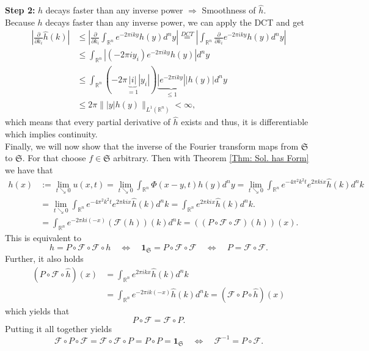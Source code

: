 \documentclass[A4,12pt,twoside]{book}
\begin{document}
{\textbf{Step 2:} $h$ decays faster than any inverse power $\Rightarrow$ Smoothness of $\hat{h}$.\\
Because $h$ decays faster than any inverse power, we can apply the DCT and get 
\begin{align*}
    |\frac{\partial}{\partial k_i} \hat{h}(k)| &\leq \left| \frac{\partial}{\partial k_i} \int_{\mathbb{R}^n} e^{-2 \pi i ky} h(y) d^n y \right| \stackrel{DCT}{=}  \left| \int_{\mathbb{R}^n} \frac{\partial}{\partial k_i}    e^{-2 \pi i ky} h(y) d^n y \right| \\
    &\leq  \int_{\mathbb{R}^n}  \left| (-2 \pi i y_i)  e^{-2 \pi i ky} h(y)\right|  d^n y \\
    &\leq  \int_{\mathbb{R}^n}  (-2 \pi \underbrace{|i|}_{=1} |y_i|)  \underbrace{\left|e^{-2 \pi i ky}\right|}_{\leq 1}  |h(y) | d^n y \\
    &\leq 2 \pi \| |y| h(y) \|_{L^1(\mathbb{R}^n)}< \infty,
\end{align*}
which means that every partial derivative of $\hat{h}$ exists and thus, it is differentiable which implies continuity.\\
Finally, we will now show that the inverse of the Fourier transform maps from $\mathfrak{S}$ to $\mathfrak{S}$. For that choose $f \in \mathfrak{S}$ arbitrary. Then with Theorem \ref{Thm: Sol. has Form} we have that
\begin{align*}
h(x) &:= \lim_{t \searrow 0} u(x,t) =\lim_{t \searrow 0} \int_{\mathbb{R}^n} \Phi (x-y,t) h(y)d^n y  =\lim_{t \searrow 0} \int_{\mathbb{R}^n} e^{-4 \pi^2 k^2 t} e^{2 \pi k i x} \hat{h}(k) d^n k\\
&= \lim_{t \searrow 0} \int_{\mathbb{R}^n} e^{-4 \pi^2 k^2 t} e^{2 \pi k i x} \hat{h}(k) d^n k = \int_{\mathbb{R}^n} e^{2 \pi k i x} \hat{h}(k) d^n k.\\
&= \int_{\mathbb{R}^n} e^{-2 \pi k i(- x)} (\mathcal{F}(h))(k) d^n k= ((P \circ \mathcal{F} \circ \mathcal{F} )(h) )(x).
\end{align*}
This is equivalent to 
\[
h= P \circ \mathcal{F} \circ \mathcal{F} \circ h \quad \iff \quad \textbf{1}_\mathfrak{S} = P \circ \mathcal{F} \circ \mathcal{F} \quad \iff \quad P = \mathcal{F} \circ \mathcal{F}.
\]
Further, it also holds 
\begin{align*}
    (P \circ \mathcal{F} \circ \hat{h} )(x) &= \int_{\mathbb{R}^n} e^{2 \pi i k x} \hat{h}(k) d^n k \\
    &= \int_{\mathbb{R}^n} e^{-2 \pi i k (-x)} \hat{h}(k) d^n k= (\mathcal{F} \circ P \circ \hat{h})(x) 
\end{align*}
which yields that 
\[
P \circ \mathcal{F} = \mathcal{F} \circ P.
\]
Putting it all together yields 
\[
\mathcal{F} \circ P \circ \mathcal{F} = \mathcal{F} \circ \mathcal{F} \circ P = P \circ P = \textbf{1}_{\mathfrak{S}} \quad \iff \quad \mathcal{F}^{-1} = P \circ \mathcal{F}.
\]
    }
\end{document}

